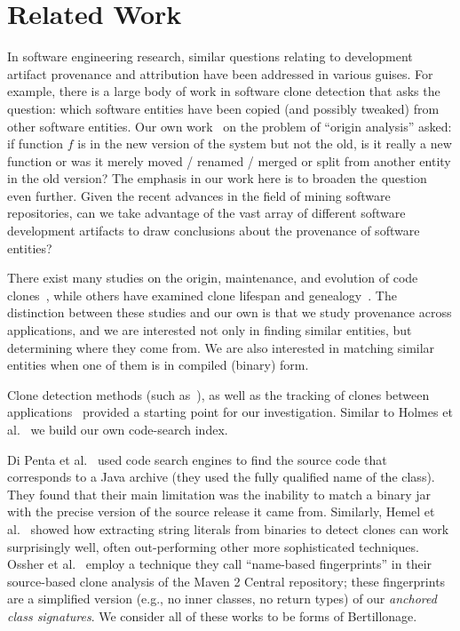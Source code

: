 \section{Related Work{\label{sec:background}}}

In software engineering research, similar questions relating to development
artifact provenance and attribution have been addressed in various guises.
For example, there is a large body of work in software clone detection that
asks the question: which software entities have been copied (and possibly
tweaked) from other software entities.  Our own work~\cite{Godfrey2005tse}
on the problem of ``origin analysis'' asked: if function $f$ is in the new
version of the system but not the old, is it really a new function or was
it merely moved / renamed / merged or split from another entity in the old
version?  The emphasis in our work here is to broaden the question even
further.  Given the recent advances in the field of mining software
repositories, can we take advantage of the vast array of different
software development artifacts to draw conclusions about the provenance of
software entities?


There exist many studies on the origin, maintenance, and evolution of code
clones~\cite{KapserG08,Krinke2008,Lozano2008,Lozano2007,ST09}, while others
have examined clone lifespan and genealogy~\cite{Kim2005fse}.  The
distinction between these studies and our own is that we study provenance
across applications, and we are interested not only in finding similar
entities, but determining where they come from.  We are also interested in
matching similar entities when one of them is in compiled (binary) form.

Clone detection methods (such as~\cite{KamiyaKI02,LivieriHMI07}), as well
as the tracking of clones between applications~\cite{GermanPGA09} provided
a starting point for our investigation.  Similar to Holmes et
al.~\cite{HolmesWM06} we build our own code-search index.

Di Penta et al.~\cite{DiPentaMSR2010} used code search engines to find the
source code that corresponds to a Java archive (they used the fully
qualified name of the class). They found that their main limitation was the
inability to match a binary jar with the precise version of the source release
it came from.
Similarly, Hemel et al.~\cite{HemelKVD11} showed how extracting
string literals from binaries to detect clones can work surprisingly well,
often out-performing other more sophisticated techniques.
Ossher et al.~\cite{OssherSL11} employ a technique they call
``name-based fingerprints'' in their source-based clone analysis of the Maven 2
Central repository; these fingerprints are a simplified version (e.g., no inner classes,
no return types) of our \emph{anchored class signatures}.
We consider all of these works to be forms of Bertillonage.

